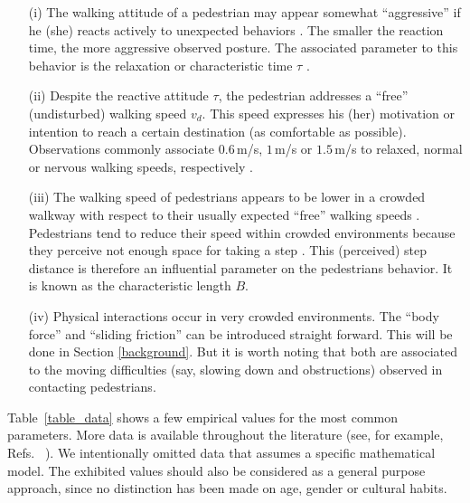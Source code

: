 \documentclass[preprint,12pt]{elsarticle}
\begin{document}
\begin{itemize}
\item[(i)] The walking attitude of a pedestrian may appear somewhat 
  ``aggressive'' if he (she) reacts actively to unexpected behaviors 
\cite{lakoba_2005,helbing_1995}. The smaller the reaction time, the more 
 aggressive observed posture. The associated parameter to this 
behavior is the relaxation or characteristic time $\tau$ 
\cite{johansson_2009,helbing_2000}. 

\item[(ii)] Despite the reactive attitude $\tau$, the pedestrian addresses a 
``free'' (undisturbed) walking speed $v_d$. This speed expresses his (her) 
motivation or intention to reach a certain destination (as comfortable as 
possible). Observations commonly associate $0.6\,$m/s, $1\,$m/s or $1.5\,$m/s 
to relaxed, normal or nervous walking speeds, respectively  
\cite{helbing_1995,helbing_2000,li_2015}. 

\item[(iii)] The walking speed of pedestrians appears to be lower in a 
crowded walkway with respect to their usually expected ``free'' walking speeds 
\cite{weidmann_1992,lakoba_2005}. Pedestrians tend to reduce their speed within 
crowded environments because they perceive not enough space for taking a 
step  \cite{johansson_2009}. This (perceived) step distance 
is therefore an influential parameter on the pedestrians behavior. 
It is known as the characteristic length $B$.

\item[(iv)] Physical interactions occur in very crowded environments. The 
``body force''  and ``sliding friction'' can be introduced straight forward. 
This will be done in Section \ref{background}. But it is worth noting that 
both are associated to the moving difficulties (say, slowing down and 
obstructions) observed in contacting pedestrians. 

\end{itemize}


Table~\ref{table_data} shows a few empirical values
 for the most common 
parameters. More data is available throughout the literature (see, for example, 
Refs.~\cite{hoogendoorn_2007,seyfried_2007,johansson_2007,moussaid_2009,
luber_2010,seer_2014,li_2015} ). We intentionally omitted data that assumes a 
specific mathematical model. The exhibited values should also be considered as a 
general purpose approach, since no distinction has been made on age, gender or 
cultural habits. \\
\end{document}
